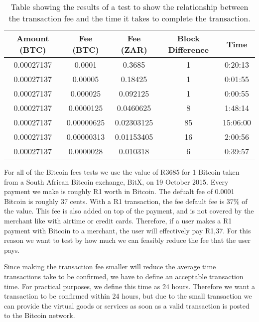 \begin{table}
	\small
	\begin{center}

	\caption{Table showing the results of a test to show the relationship between the transaction fee and the time it takes to complete the transaction.} 
		\begin{tabular}	{ | c| c | c | c | c|}
		\hline
		\textbf{Amount (BTC)} & \textbf{Fee (BTC)} & \textbf{Fee (ZAR)} & \textbf{Block Difference} & \textbf{Time}\\ \hline
		 0.00027137 & 0.0001 & 0.3685 & 1 & 0:20:13 \\ \hline
		 0.00027137 & 0.00005 & 0.18425 & 1 & 0:01:55 \\ \hline
		 0.00027137 & 0.000025 & 0.092125 & 1 & 0:00:55 \\ \hline
		 0.00027137 & 0.0000125 & 0.0460625 & 8 & 1:48:14 \\ \hline
		 0.00027137 & 0.00000625 & 0.02303125 & 85 & 15:06:00 \\ \hline
		 0.00027137 & 0.00000313 & 0.01153405 & 16 & 2:00:56 \\ \hline
		 0.00027137 & 0.0000028 & 0.010318 & 6 & 0:39:57 \\ \hline
		\end{tabular}
		
		\label{tbl:transaction_times}
	\end{center}
\end{table}

For all of the Bitcoin fees tests we use the value of R3685 for 1 Bitcoin taken from a South African Bitcoin exchange, BitX, on 19 October 2015. Every payment we make is roughly R1 worth in Bitcoin. The defualt fee of 0.0001 Bitcoin is roughly 37 cents. With a R1 transaction, the fee default fee is 37\% of the value. This fee is also added on top of the payment, and is not covered by the merchant like with airtime or credit cards. Therefore, if a user makes a R1 payment with Bitcoin to a merchant, the user will effectively pay R1,37. For this reason we want to test by how much we can feasibly reduce the fee that the user pays.

Since making the transaction fee smaller will reduce the average time transactions take to be confirmed, we have to define an acceptable transaction time. For practical purposes, we define this time as 24 hours. Therefore we want a transaction to be confirmed within 24 hours, but due to the small transaction we can provide the virtual goods or services as soon as a valid transaction is posted to the Bitcoin network.

